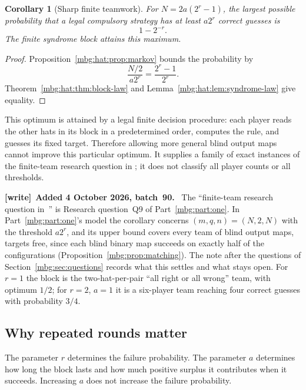 \documentclass[11pt,letterpaper]{article}
\newtheorem{corollary}[theorem]{Corollary}
\theoremstyle{definition}
\newenvironment{writenote}[1][]{\par\smallskip\begingroup\small
 \noindent\textbf{[write]}\if\relax\detokenize{#1}\relax\else~\textbf{#1.}\fi\ }%
 {\par\endgroup\smallskip}
\begin{document}
\begin{corollary}[Sharp finite teamwork]\label{mbg:hat:cor:finite-optimal}
For \(N=2a(2^r-1)\), the largest possible probability that a legal
compulsory strategy has at least \(a2^r\) correct guesses is
\[
  1-2^{-r}.
\]
The finite syndrome block attains this maximum.
\end{corollary}
\begin{proof}
Proposition~\ref{mbg:hat:prop:markov} bounds the probability by
\[
  \frac{N/2}{a2^r}
  =\frac{2^r-1}{2^r}.
\]
Theorem~\ref{mbg:hat:thm:block-law} and Lemma~\ref{mbg:hat:lem:syndrome-law} give equality.
\end{proof}

This optimum is attained by a legal finite decision procedure: each
player reads the other hats in its block in a predetermined order,
computes the rule, and guesses its fixed target. Therefore allowing
more general blind output maps cannot improve this particular optimum.
It supplies a family of exact instances of the finite-team research
question in \cite{hat:ProveItBoxes}; it does not classify all player counts
or all thresholds.

\begin{writenote}[Added 4 October 2026, batch~90]
The ``finite-team research question in~\cite{hat:ProveItBoxes}'' is Research question~Q9 of Part~\ref{mbg:part:one}. In Part~\ref{mbg:part:one}'s model the corollary concerns $(m,q,n)=(N,2,N)$ with the threshold $a2^r$, and its upper bound covers every team of blind output maps, targets free, since each blind binary map succeeds on exactly half of the configurations (Proposition~\ref{mbg:prop:matching}). The note after the questions of Section~\ref{mbg:sec:questions} records what this settles and what stays open. For $r=1$ the block is the two-hat-per-pair ``all right or all wrong'' team, with optimum $1/2$; for $r=2$, $a=1$ it is a six-player team reaching four correct guesses with probability $3/4$.
\end{writenote}

\subsection{Why repeated rounds matter}

The parameter \(r\) determines the failure probability.
The parameter \(a\) determines how long the block lasts and how much
positive surplus it contributes when it succeeds. Increasing \(a\)
does not increase the failure probability.
\end{document}
